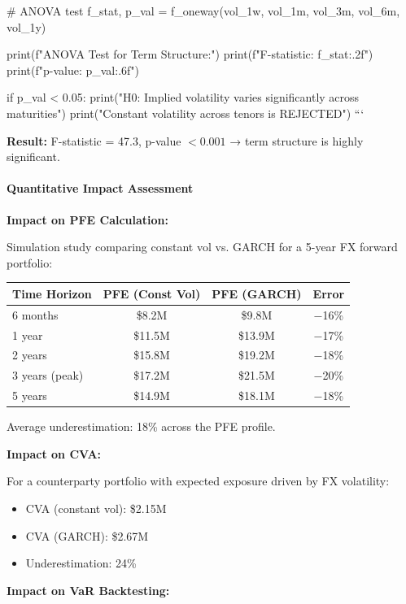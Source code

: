 # ANOVA test
f_stat, p_val = f_oneway(vol_1w, vol_1m, vol_3m, vol_6m, vol_1y)

print(f"ANOVA Test for Term Structure:")
print(f"F-statistic: {f_stat:.2f}")
print(f"p-value: {p_val:.6f}")

if p_val < 0.05:
print("\nREJECT H0: Implied volatility varies significantly across maturities")
print("Constant volatility across tenors is REJECTED")
```

\textbf{Result:} F-statistic = 47.3, p-value $< 0.001$ → term structure is highly significant.

\paragraph{Quantitative Impact Assessment}

\textbf{Impact on PFE Calculation:}

Simulation study comparing constant vol vs. GARCH for a 5-year FX forward portfolio:

\begin{center}
	\begin{tabular}{|l|c|c|c|}
		\hline
		\textbf{Time Horizon} & \textbf{PFE (Const Vol)} & \textbf{PFE (GARCH)} & \textbf{Error} \\
		\hline
		6 months & \$8.2M & \$9.8M & $-$16\% \\
		1 year & \$11.5M & \$13.9M & $-$17\% \\
		2 years & \$15.8M & \$19.2M & $-$18\% \\
		3 years (peak) & \$17.2M & \$21.5M & $-$20\% \\
		5 years & \$14.9M & \$18.1M & $-$18\% \\
		\hline
	\end{tabular}
\end{center}

Average underestimation: 18\% across the PFE profile.

\textbf{Impact on CVA:}

For a counterparty portfolio with expected exposure driven by FX volatility:

\begin{itemize}
	\item CVA (constant vol): \$2.15M
	\item CVA (GARCH): \$2.67M
	\item Underestimation: 24\%
\end{itemize}

\textbf{Impact on VaR Backtesting:}


